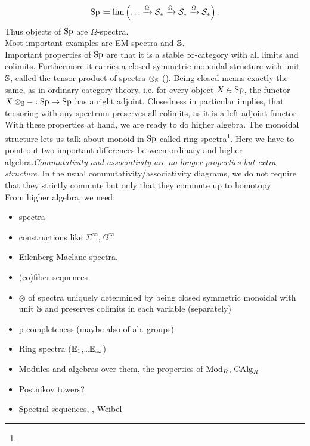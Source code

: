 \begin{equation*}
    \Sp\coloneqq \lim\left( \dots\xrightarrow{\Omega}\Spc_* \xrightarrow{\Omega} \Spc_* \xrightarrow{\Omega}\Spc_* \right).
\end{equation*}
Thus objects of $\Sp$ are $\Omega$-spectra. \\
Most important examples are EM-spectra and $\S$.\\
Important properties of $\Sp$ are that it is a stable $\infty$-category with all limits and colimits. Furthermore it carries a closed symmetric monoidal structure with unit $\S$, called the tensor product of spectra $\otimes_\S$ (\cite[Corollary~4.8.2.19]{lurie2017higher}). Being closed means exactly the same, as in ordinary category theory, i.e. for every object $X\in \Sp$, the functor $X\otimes_\S-:\Sp\to \Sp $ has a right adjoint. 
Closedness in particular implies, that tensoring with any spectrum preserves all colimits, as it is a left adjoint functor. \\
With these properties at hand, we are ready to do higher algebra.
The monoidal structure lets us talk about monoid in $\Sp$ called ring spectra\footnote{}. Here we have to point out two important differences between ordinary and higher algebra.\textit{Commutativity and associativity are no longer  properties but extra structure}. In the usual commutativity/associativity diagrams, we do not require that they strictly commute but only that they commute up to homotopy  
\\
From higher algebra, we need:
\begin{itemize}
    \item spectra
    \item constructions like $\Sigma^\infty,\Omega^\infty$ 
    \item Eilenberg-Maclane spectra.
    \item (co)fiber sequences
    \item $\otimes$ of spectra uniquely determined by being closed symmetric monoidal with unit $\S$ and preserves colimits in each variable (separately)
    \item p-completeness (maybe also of ab. groups)
    \item Ring spectra ($\Eone$,\dots $\Einf$)
    \item Modules and algebras over them, the properties of $\Mod_R$, $\CAlg_R$
    \item Postnikov towers?
    \item Spectral sequences, \cite[Section~1.2.2]{lurie2017higher}, Weibel \cite[Chapter~5]{weibel1994introduction}
\end{itemize}
